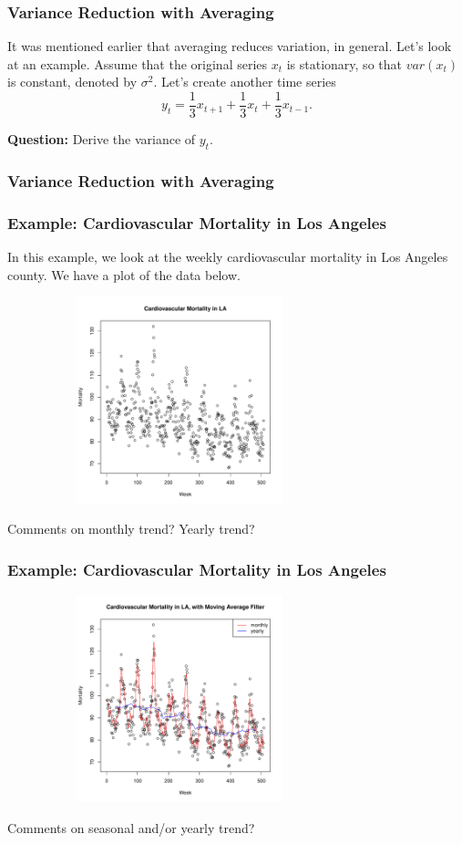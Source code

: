 \documentclass[%
xcolor=pdftex]{beamer}
\begin{document}
\begin{frame}
\frametitle{Variance Reduction with Averaging}

It was mentioned earlier that averaging reduces variation, in general. Let's look at an example. Assume that the original series $x_t$  is
stationary, so that $var(x_t)$ is constant, denoted by $\sigma^2$. Let's create another time series
$$
y_t=\frac{1}{3} x_{t+1}+\frac{1}{3} x_{t}+\frac{1}{3} x_{t-1}.
$$

\textbf{Question:} Derive the variance of $y_t$.

\end{frame}

\begin{frame}
\frametitle{Variance Reduction with Averaging}


\end{frame}

\begin{frame}
\frametitle{Example: Cardiovascular Mortality in Los Angeles}

In this example, we look at the weekly cardiovascular mortality in Los Angeles county. We have a plot of the data below.

\includegraphics[width=100mm, height=60mm]{mort.pdf}

Comments on monthly trend? Yearly trend?

\end{frame}



\begin{frame}
\frametitle{Example: Cardiovascular Mortality in Los Angeles}

\includegraphics[width=100mm, height=60mm]{filter.pdf}

Comments on seasonal and/or yearly trend?

\end{frame}
\end{document}
